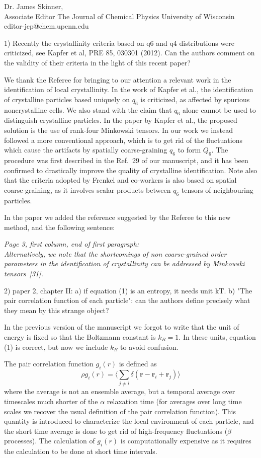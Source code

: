 \documentclass[a4paper, rebuttal, parskip=true, firsthead=false, fromemail=false, foldmarks=false]{scrlttr2}
\begin{document}
\begin{letter}{Dr. James Skinner,\\Associate Editor
The Journal of Chemical Physics
University of Wisconsin\\
editor-jcp@chem.upenn.edu }
\begin{quotationi}
1) Recently the crystallinity criteria based on q6 and q4 distributions
were criticized, see Kapfer et al, PRE 85, 030301 (2012). Can the authors
comment on the validity of their criteria in the light of this recent paper?
\end{quotationi}

We thank the Referee for bringing to our attention a relevant work in the identification of
local crystallinity. In the work of Kapfer et al., the identification of crystalline
particles based uniquely on $q_6$ is criticized, as affected by spurious noncrystalline cells.
We also stand with the claim that $q_6$ alone cannot be used to distinguish crystalline particles. In the
paper by Kapfer et al., the proposed solution is the use of rank-four Minkowski tensors. In our work
we instead followed a more conventional approach, which is to get rid of the fluctuations which
cause the artifacts by spatially coarse-graining $q_6$ to form $Q_6$. The procedure was first
described in the Ref.~29 of our manuscript, and it has been confirmed to drastically improve the
quality of crystalline identification. Note also that the criteria adopted by Frenkel and co-workers
is also based on spatial coarse-graining, as it involves scalar products between $q_6$ tensors of
neighbouring particles.

In the paper we added the reference suggested by the Referee to this new method, and the following sentence:

{\it Page 3, first column, end of first paragraph:\\
Alternatively, we note that the shortcomings of
non coarse-grained order parameters in the identification of crystallinity can be addressed by Minkowski tensors~[31]. 
}


\begin{quotationi}
2) paper 2, chapter II: a) if equation (1) is an entropy, it needs unit kT.
b) "The pair correlation function of each particle": can the authors
define precisely what they mean by this strange object?
\end{quotationi}

In the previous version of the manuscript we forgot to write that the unit of energy is
fixed so that the Boltzmann constant is $k_B=1$. In these units, equation (1) is correct, but now we include
$k_B$ to avoid confusion.

The pair correlation function $g_i(r)$ is defined as
$$
\rho g_i(r)=\langle \sum_{j\neq i}\delta(\mathbf{r}-\mathbf{r}_i+\mathbf{r}_j)\rangle
$$
where the average is not an ensemble average, but a temporal average over timescales much shorter
of the $\alpha$ relaxation time (for averages over long time scales we recover the usual definition
of the pair correlation function). This quantity is introduced to characterize the local environment
of each particle, and the short time average is done to get rid of high-frequency fluctuations ($\beta$ processes).
The calculation of $ g_i(r)$ is computationally expensive as it requires the calculation to be done at short
time intervals.


\end{letter}
\end{document}

